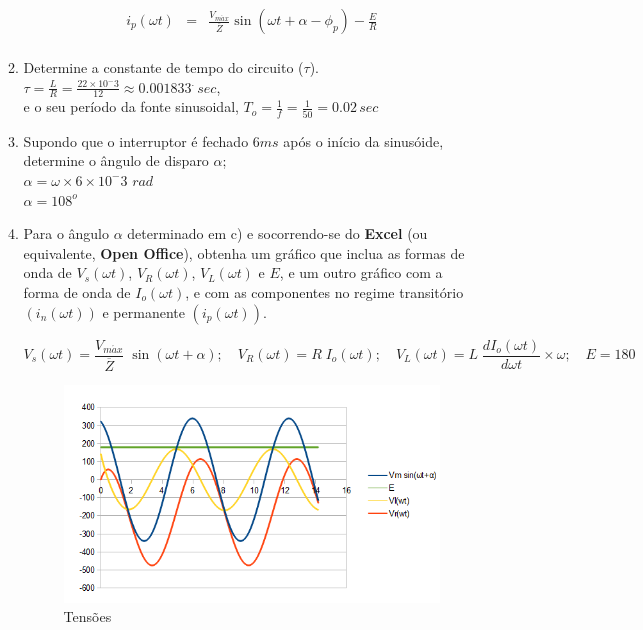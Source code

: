 \documentclass[titlepage, a4paper, 11pt, reqno, openany]{report}
\begin{document}
\begin{enumerate}
\begin{enumerate}
\begin{eqnarray}
i_p(\omega t) &=& \frac{V_{m\acute{a}x}}{\overline{Z}}\sin(\omega t + \alpha - \phi_p)-\frac{E}{R}\\
\end{eqnarray}\par
\item 
Determine a constante de tempo do circuito ($\tau$).\\
$\tau=\frac{L}{R}=\frac{22\times 10^-3}{12}\approx 0.001833^.\, sec$,\\
e o seu per\'{i}odo da fonte sinusoidal, $T_o=\frac{1}{f}=\frac{1}{50}=0.02\, sec$
\item 
Supondo que o interruptor \'{e} fechado $6ms$ ap\'{o}s o in\'{i}cio da sinus\'{o}ide, determine 
o \^{a}ngulo de disparo $\alpha$;\\
$\alpha = \omega \times 6\times 10^-3\,\, rad$\\
$\alpha = 108^o$
\item
Para o \^{a}ngulo $\alpha$ determinado em c) e socorrendo-se do {\bf Excel} (ou equivalente, {\bf Open Office}), obtenha um gr\'{a}fico que inclua as formas de onda de $V_s(\omega t)$, $V_R(\omega t)$, $V_L(\omega t)$ e $E$, e um outro gr\' {a}fico com a forma de onda de $I_o(\omega t)$, e com as componentes no regime transit\'{o}rio $(i_n(\omega t))$ e permanente $(i_p(\omega t))$.\par
%
\begin{equation}
V_s(\omega t) = \frac{V_{m\acute{a}x}}{\overline{Z}} \; \sin(\omega t + \alpha); \quad
V_R(\omega t) = R \; I_o(\omega t); \quad
V_L(\omega t) = L \; \dfrac{d I_o(\omega t)}{d \omega t} \times \omega; \quad
E = 180 \nonumber
\end{equation}\par
%
\begin{figure}[H]
\centering
\includegraphics[width=0.90\linewidth]{./image/P2A1p1_1_d_1.png}
\caption{Tens\~{o}es}

\end{figure}
\end{enumerate}
\end{enumerate}
\end{document}
